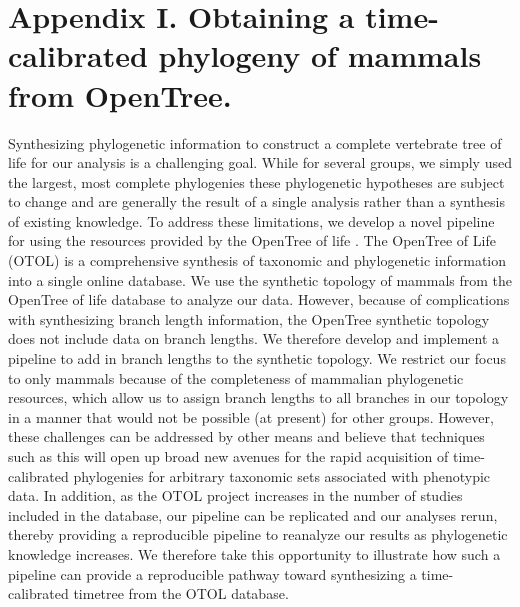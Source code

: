 \documentclass[a4paper,11pt]{article}
\begin{document}
\section*{Appendix I. Obtaining a time-calibrated phylogeny of mammals from OpenTree.}
Synthesizing phylogenetic information to construct a complete vertebrate tree of life for our analysis is a challenging goal. While for several groups, we simply used the largest, most complete phylogenies these phylogenetic hypotheses are subject to change and are generally the result of a single analysis rather than a synthesis of existing knowledge. To address these limitations, we develop a novel pipeline for using the resources provided by the OpenTree of life \citep{Smith2014}. The OpenTree of Life (OTOL) is a comprehensive synthesis of taxonomic and phylogenetic information into a single online database. We use the synthetic topology of mammals from the OpenTree of life database to analyze our data. However, because of complications with synthesizing branch length information, the OpenTree synthetic topology does not include data on branch lengths. We therefore develop and implement a pipeline to add in branch lengths to the synthetic topology. We restrict our focus to only mammals because of the completeness of mammalian phylogenetic resources, which allow us to assign branch lengths to all branches in our topology in a manner that would not be possible (at present) for other groups. However, these challenges can be addressed by other means and believe that techniques such as this will open up broad new avenues for the rapid acquisition of time-calibrated phylogenies for arbitrary taxonomic sets associated with phenotypic data. In addition, as the OTOL project increases in the number of studies included in the database, our pipeline can be replicated and our analyses rerun, thereby providing a reproducible pipeline to reanalyze our results as phylogenetic knowledge increases. We therefore take this opportunity to illustrate how such a pipeline can provide a reproducible pathway toward synthesizing a time-calibrated timetree from the OTOL database. 
\end{document}
